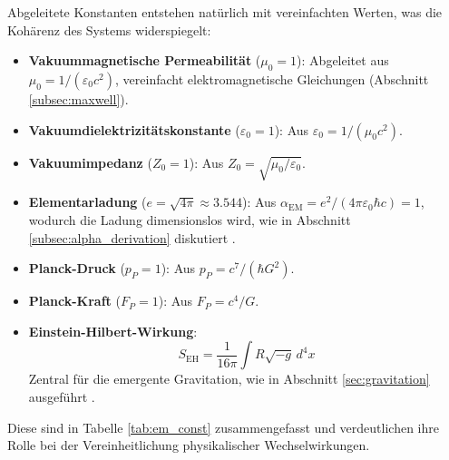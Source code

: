 \documentclass[12pt,a4paper]{article}
\begin{document}
	Abgeleitete Konstanten entstehen natürlich mit vereinfachten Werten, was die Kohärenz des Systems widerspiegelt:
	\begin{itemize}
		\item \textbf{Vakuummagnetische Permeabilität} (\(\mu_0 = 1\)): Abgeleitet aus \(\mu_0 = 1/(\varepsilon_0 c^2)\), vereinfacht elektromagnetische Gleichungen (Abschnitt \ref{subsec:maxwell}).
		\item \textbf{Vakuumdielektrizitätskonstante} (\(\varepsilon_0 = 1\)): Aus \(\varepsilon_0 = 1/(\mu_0 c^2)\).
		\item \textbf{Vakuumimpedanz} (\(Z_0 = 1\)): Aus \(Z_0 = \sqrt{\mu_0/\varepsilon_0}\).
		\item \textbf{Elementarladung} (\(e = \sqrt{4\pi} \approx 3.544\)): Aus \(\alpha_{\text{EM}} = e^2/(4\pi \varepsilon_0 \hbar c) = 1\), wodurch die Ladung dimensionslos wird, wie in Abschnitt \ref{subsec:alpha_derivation} diskutiert \cite{Dirac1928}.
		\item \textbf{Planck-Druck} (\(p_P = 1\)): Aus \(p_P = c^7/(\hbar G^2)\).
		\item \textbf{Planck-Kraft} (\(F_P = 1\)): Aus \(F_P = c^4/G\).
		\item \textbf{Einstein-Hilbert-Wirkung}:
		\[
		S_{\text{EH}} = \frac{1}{16\pi} \int R \sqrt{-g} \, d^4x
		\]
		Zentral für die emergente Gravitation, wie in Abschnitt \ref{sec:gravitation} ausgeführt \cite{pascher_emergente_2025}.
	\end{itemize}
	
	Diese sind in Tabelle \ref{tab:em_const} zusammengefasst und verdeutlichen ihre Rolle bei der Vereinheitlichung physikalischer Wechselwirkungen.
	
\end{document}
